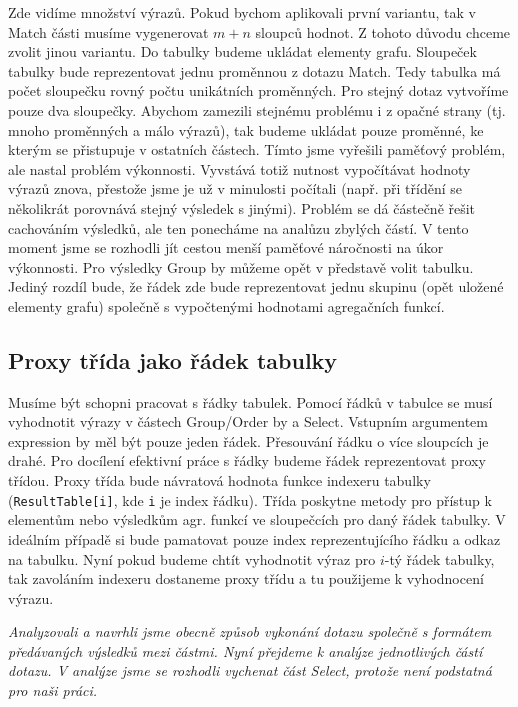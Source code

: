 Zde vidíme množství výrazů.
Pokud bychom aplikovali první variantu, tak v Match části musíme vygenerovat $m + n$ sloupců hodnot.
Z tohoto důvodu chceme zvolit jinou variantu.
Do tabulky budeme ukládat elementy grafu.
Sloupeček tabulky bude reprezentovat jednu proměnnou z dotazu Match.
Tedy tabulka má počet sloupečku rovný počtu unikátních proměnných. 
Pro stejný dotaz vytvoříme pouze dva sloupečky.
Abychom zamezili stejnému problému i z opačné strany (tj. mnoho proměnných a málo výrazů), tak budeme ukládat pouze proměnné, ke kterým se přistupuje v ostatních částech.
Tímto jsme vyřešili paměťový problém, ale nastal problém výkonnosti.
Vyvstává totiž nutnost vypočítávat hodnoty výrazů znova, přestože jsme je už v minulosti počítali (např. při třídění se několikrát porovnává stejný výsledek s jinými).
Problém se dá částečně řešit cachováním výsledků, ale ten ponecháme na analůzu zbylých částí.
V tento moment jsme se rozhodli jít cestou menší paměťové náročnosti na úkor výkonnosti.
Pro výsledky Group by můžeme opět v představě volit tabulku.
Jediný rozdíl bude, že řádek zde bude reprezentovat jednu skupinu (opět uložené elementy grafu) společně s vypočtenými hodnotami agregačních funkcí.

\subsection{Proxy třída jako řádek tabulky}

Musíme být schopni pracovat s řádky tabulek.
Pomocí řádků v tabulce se musí vyhodnotit výrazy v částech Group/Order by a Select.
Vstupním argumentem expression by měl být pouze jeden řádek.
Přesouvání řádku o více sloupcích je drahé.
Pro docílení efektivní práce s řádky budeme řádek reprezentovat proxy třídou.
Proxy třída bude návratová hodnota funkce indexeru tabulky (\texttt{ResultTable[i]}, kde \texttt{i} je index řádku).
Třída poskytne metody pro přístup k elementům nebo výsledkům agr. funkcí ve sloupečcích pro daný řádek tabulky.
V ideálním případě si bude pamatovat pouze index reprezentujícího řádku a odkaz na tabulku.
Nyní pokud budeme chtít vyhodnotit výraz pro $i$-tý řádek tabulky, tak zavoláním indexeru dostaneme proxy třídu a tu použijeme k vyhodnocení výrazu.

\bigskip
\textit{Analyzovali a navrhli jsme obecně způsob vykonání dotazu společně s formátem předávaných výsledků mezi částmi. 
Nyní přejdeme k analýze jednotlivých částí dotazu. 
V analýze jsme se rozhodli vychenat část Select, protože není podstatná pro naši práci.}

